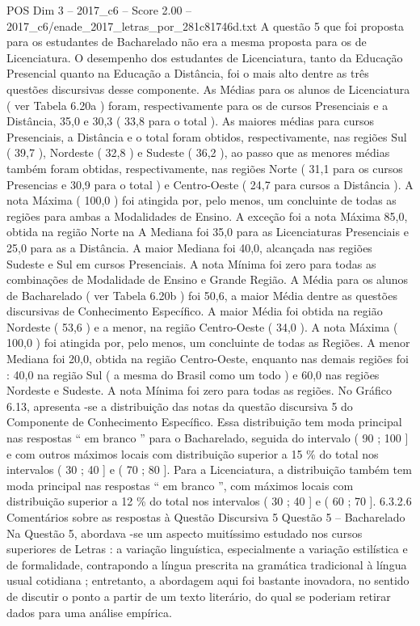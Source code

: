 \begin{textsample}{POS Dim 3 – 2017\_c6 – Score 2.00 – 2017\_c6/enade\_2017\_letras\_por\_281c81746d.txt}
A questão 5 que foi proposta para os estudantes de Bacharelado não era a mesma proposta para os de Licenciatura.
O desempenho dos estudantes de Licenciatura, tanto da Educação Presencial quanto na Educação a Distância, foi o mais alto dentre as três questões discursivas desse componente.
As Médias para os alunos de Licenciatura ( ver Tabela 6.20a ) foram, respectivamente para os de cursos Presenciais e a Distância, 35,0 e 30,3 ( 33,8 para o total ).
As maiores médias para cursos Presenciais, a Distância e o total foram obtidos, respectivamente, nas regiões Sul ( 39,7 ), Nordeste ( 32,8 ) e Sudeste ( 36,2 ), ao passo que as menores médias também foram obtidas, respectivamente, nas regiões Norte ( 31,1 para os cursos Presencias e 30,9 para o total ) e Centro-Oeste ( 24,7 para cursos a Distância ).
A nota Máxima ( 100,0 ) foi atingida por, pelo menos, um concluinte de todas as regiões para ambas a Modalidades de Ensino.
A exceção foi a nota Máxima 85,0, obtida na região Norte na A Mediana foi 35,0 para as Licenciaturas Presenciais e 25,0 para as a Distância.
A maior Mediana foi 40,0, alcançada nas regiões Sudeste e Sul em cursos Presenciais.
A nota Mínima foi zero para todas as combinações de Modalidade de Ensino e Grande Região.
A Média para os alunos de Bacharelado ( ver Tabela 6.20b ) foi 50,6, a maior Média dentre as questões discursivas de Conhecimento Específico.
A maior Média foi obtida na região Nordeste ( 53,6 ) e a menor, na região Centro-Oeste ( 34,0 ).
A nota Máxima ( 100,0 ) foi atingida por, pelo menos, um concluinte de todas as Regiões.
A menor Mediana foi 20,0, obtida na região Centro-Oeste, enquanto nas demais regiões foi : 40,0 na região Sul ( a mesma do Brasil como um todo ) e 60,0 nas regiões Nordeste e Sudeste.
A nota Mínima foi zero para todas as regiões.
No Gráfico 6.13, apresenta -se a distribuição das notas da questão discursiva 5 do Componente de Conhecimento Específico.
Essa distribuição tem moda principal nas respostas “ em branco ” para o Bacharelado, seguida do intervalo ( 90 ; 100 ] e com outros máximos locais com distribuição superior a 15 \% do total nos intervalos ( 30 ; 40 ] e ( 70 ; 80 ].
Para a Licenciatura, a distribuição também tem moda principal nas respostas “ em branco ”, com máximos locais com distribuição superior a 12 \% do total nos intervalos ( 30 ; 40 ] e ( 60 ; 70 ]. 6.3.2.6 Comentários sobre as respostas à Questão Discursiva 5 Questão 5 – Bacharelado Na Questão 5, abordava -se um aspecto muitíssimo estudado nos cursos superiores de Letras : a variação linguística, especialmente a variação estilística e de formalidade, contrapondo a língua prescrita na gramática tradicional à língua usual cotidiana ; entretanto, a abordagem aqui foi bastante inovadora, no sentido de discutir o ponto a partir de um texto literário, do qual se poderiam retirar dados para uma análise empírica.

\end{textsample}
